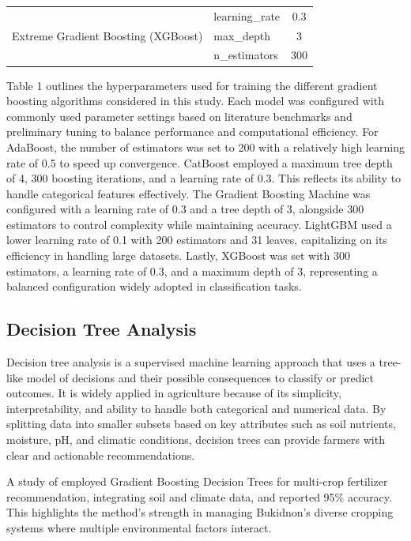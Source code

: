 {\begin{table}[ht]
\begin{tabular}{l l c}
			\midrule
			
			\multirow{3}{*}{Extreme Gradient Boosting (XGBoost)} 
			& learning\_rate & 0.3 \\
			& max\_depth & 3 \\
			& n\_estimators & 300 \\
			
			\bottomrule
		\end{tabular}
	\end{table}
	
	Table 1 outlines the hyperparameters used for training the different gradient boosting algorithms considered in this study. Each model was configured with commonly used parameter settings based on literature benchmarks and preliminary tuning to balance performance and computational efficiency. For AdaBoost, the number of estimators was set to 200 with a relatively high learning rate of 0.5 to speed up convergence. CatBoost employed a maximum tree depth of 4, 300 boosting iterations, and a learning rate of 0.3. This reflects its ability to handle categorical features effectively. The Gradient Boosting Machine was configured with a learning rate of 0.3 and a tree depth of 3, alongside 300 estimators to control complexity while maintaining accuracy. LightGBM used a lower learning rate of 0.1 with 200 estimators and 31 leaves, capitalizing on its efficiency in handling large datasets. Lastly, XGBoost was set with 300 estimators, a learning rate of 0.3, and a maximum depth of 3, representing a balanced configuration widely adopted in classification tasks. 
	
	\subsection{Decision Tree Analysis}
	Decision tree analysis is a supervised machine learning approach that uses a tree-like model of decisions and their possible consequences to classify or predict outcomes. It is widely applied in agriculture because of its simplicity, interpretability, and ability to handle both categorical and numerical data. By splitting data into smaller subsets based on key attributes such as soil nutrients, moisture, pH, and climatic conditions, decision trees can provide farmers with clear and actionable recommendations.
	
	A study of \cite{Lavanya2024} employed Gradient Boosting Decision Trees for multi-crop fertilizer recommendation, integrating soil and climate data, and reported 95\% accuracy. This highlights the method’s strength in managing Bukidnon’s diverse cropping systems where multiple environmental factors interact.
	
}
